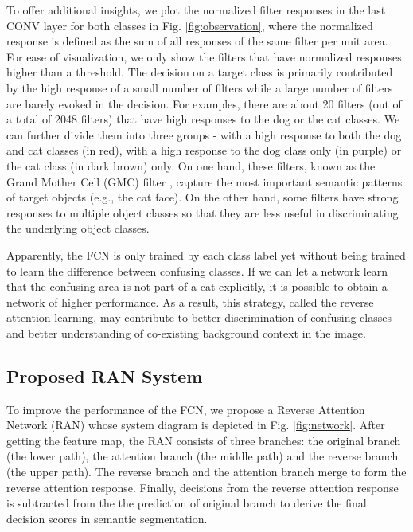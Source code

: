 \documentclass[runningheads]{llncs}
\begin{document}
To offer additional insights, we plot the normalized filter responses in
the last CONV layer for both classes in Fig.  \ref{fig:observation},
where the normalized response is defined as the sum of all responses of
the same filter per unit area. For ease of visualization, we only show
the filters that have normalized responses higher than a threshold.  The
decision on a target class is primarily contributed by the high response
of a small number of filters while a large number of filters are barely
evoked in the decision. For examples, there are about 20 filters (out of
a total of 2048 filters) that have high responses to the dog or the cat
classes.  We can further divide them into three groups - with a high
response to both the dog and cat classes (in red), with a high response
to the dog class only (in purple) or the cat class (in dark brown) only.
On one hand, these filters, known as the Grand Mother Cell (GMC) filter
\cite{gross2002genealogy,agrawal2014analyzing}, capture the most important semantic patterns of target objects (e.g., the
cat face). On the other hand, some filters have strong responses to
multiple object classes so that they are less useful in discriminating
the underlying object classes. 

Apparently, the FCN is only trained by each class label yet without
being trained to learn the difference between confusing classes.  If we
can let a network learn that the confusing area is not part of a cat
explicitly, it is possible to obtain a network of higher performance.
As a result, this strategy, called the reverse attention learning, may contribute to
better discrimination of confusing classes and better understanding of co-existing
background context in the image. 

\subsection{Proposed RAN System}

To improve the performance of the FCN, we propose a Reverse Attention
Network (RAN) whose system diagram is depicted in Fig.
\ref{fig:network}.  After getting the feature map, the RAN consists of
three branches: the original branch (the lower path), the attention
branch (the middle path) and the reverse branch (the upper path). The
reverse branch and the attention branch merge to form the reverse
attention response. Finally, decisions from the reverse attention response is subtracted from the
the prediction of original branch
to derive the final decision scores in semantic segmentation. 
\end{document}

